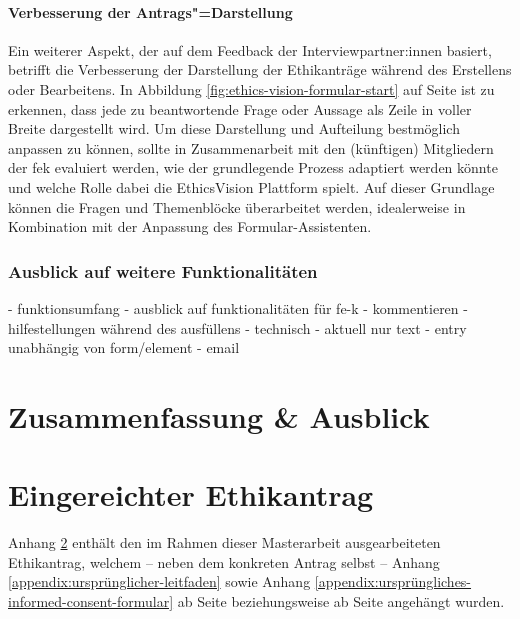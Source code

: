 \documentclass[a4paper,12pt,twoside]{scrreprt}
\begin{document}
\subsubsection*{Verbesserung der Antrags"=Darstellung}
\label{sub-sub-sec:verbesserung-antrags-darstellung}

Ein weiterer Aspekt, der auf dem Feedback der Interviewpartner:innen basiert, betrifft die Verbesserung der Darstellung der Ethikanträge während des Erstellens oder Bearbeitens. In Abbildung \ref{fig:ethics-vision-formular-start} auf Seite \pageref{fig:ethics-vision-formular-start} ist zu erkennen, dass jede zu beantwortende Frage oder Aussage als Zeile in voller Breite dargestellt wird. Um diese Darstellung und Aufteilung bestmöglich anpassen zu können, sollte in Zusammenarbeit mit den (künftigen) Mitgliedern der \ac{fek} evaluiert werden, wie der grundlegende Prozess adaptiert werden könnte und welche Rolle dabei die EthicsVision Plattform spielt. Auf dieser Grundlage können die Fragen und Themenblöcke überarbeitet werden, idealerweise in Kombination mit der Anpassung des Formular-Assistenten.

\subsection{Ausblick auf weitere Funktionalitäten}

- funktionsumfang
  - ausblick auf funktionalitäten für fe-k
    - kommentieren
    - hilfestellungen während des ausfüllens
- technisch
  - aktuell nur text
  - entry unabhängig von form/element
  - email

\cleardoublepage
\chapter{Zusammenfassung \& Ausblick}
\label{chap:zusammenfassung-ausblick}

\cleardoublepage
{}
{}
\printbibliography

\appendix

\cleardoublepage
\chapter{Eingereichter Ethikantrag}
\label{appendix:eingereichter-ethikantrag}

Anhang \ref{appendix:eingereichter-ethikantrag} enthält den im Rahmen dieser Masterarbeit ausgearbeiteten Ethikantrag, welchem -- neben dem konkreten Antrag selbst -- Anhang \ref{appendix:ursprünglicher-leitfaden} sowie Anhang \ref{appendix:ursprüngliches-informed-consent-formular} ab Seite \pageref{appendix:ursprünglicher-leitfaden} beziehungsweise ab Seite \pageref{appendix:ursprüngliches-informed-consent-formular} angehängt wurden.
\end{document}
